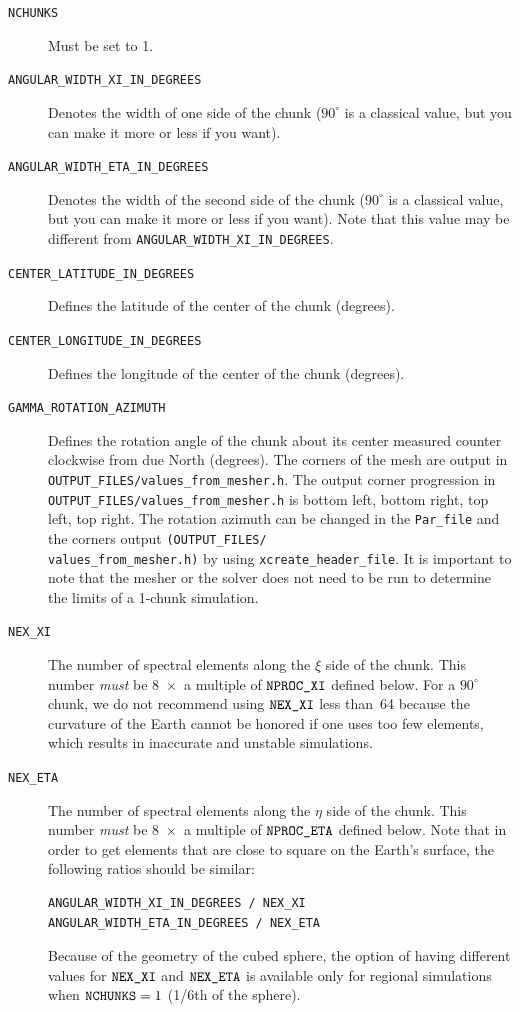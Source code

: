 \begin{description}
\item [{\texttt{NCHUNKS}}] Must be set to 1.
\item [{\texttt{ANGULAR\_WIDTH\_XI\_IN\_DEGREES}}] Denotes the width of
one side of the chunk ($90^{\circ}$ is a classical value, but you can make it more or less if you want).
\item [{\texttt{ANGULAR\_WIDTH\_ETA\_IN\_DEGREES}}] Denotes the width of
the second side of the chunk ($90^{\circ}$ is a classical value, but you can make it more or less if you want). Note that this
value may be different from \texttt{ANGULAR\_WIDTH\_XI\_IN\_DEGREES}.
\item [{\texttt{CENTER\_LATITUDE\_IN\_DEGREES}}] Defines the latitude of
the center of the chunk (degrees).
\item [{\texttt{CENTER\_LONGITUDE\_IN\_DEGREES}}] Defines the longitude
of the center of the chunk (degrees).
\item [{\texttt{GAMMA\_ROTATION\_AZIMUTH}}] Defines the rotation angle
of the chunk about its center measured counter clockwise from due
North (degrees). The corners of the mesh are output in \texttt{\small OUTPUT\_FILES/values\_from\_mesher.h}.
The output corner progression in \texttt{\small OUTPUT\_FILES/values\_from\_mesher.h}
is bottom left, bottom right, top left, top right. The rotation azimuth
can be changed in the \texttt{Par\_file} and the corners output \texttt{(}\texttt{\small OUTPUT\_FILES/}~\\
\texttt{\small values\_from\_mesher.h}\texttt{)} by using{\small{}
}\texttt{\small xcreate\_header\_file}. It is important to note that
the mesher or the solver does not need to be run to determine the
limits of a 1-chunk simulation.
\item [{\texttt{NEX\_XI}}] The number of spectral elements along the $\xi$ side
of the chunk. This number \textit{must} be 8~$\times$~a multiple
of $\mbox{\texttt{NPROC\_XI}}$ defined below. For a $90^{\circ}$ chunk, we do not
recommend using $\mbox{\texttt{NEX\_XI}}$ less than~64 because the curvature of the
Earth cannot be honored if one uses too few elements, which results
in inaccurate and unstable simulations.
\item [{\texttt{NEX\_ETA}}] The number of spectral elements along the $\eta$
side of the chunk. This number \textit{must} be 8~$\times$~a multiple
of $\mbox{\texttt{NPROC\_ETA}}$ defined below. Note that in order to get elements
that are close to square on the Earth's surface, the following ratios
should be similar:
\begin{verbatim}
ANGULAR_WIDTH_XI_IN_DEGREES / NEX_XI
ANGULAR_WIDTH_ETA_IN_DEGREES / NEX_ETA
\end{verbatim}
Because of the geometry of the cubed sphere, the option of having
different values for $\mbox{\texttt{NEX\_XI}}$ and $\mbox{\texttt{NEX\_ETA}}$ is available only for
regional simulations when $\mbox{\texttt{NCHUNKS}}=1$ (1/6th of the sphere).


\end{description}
